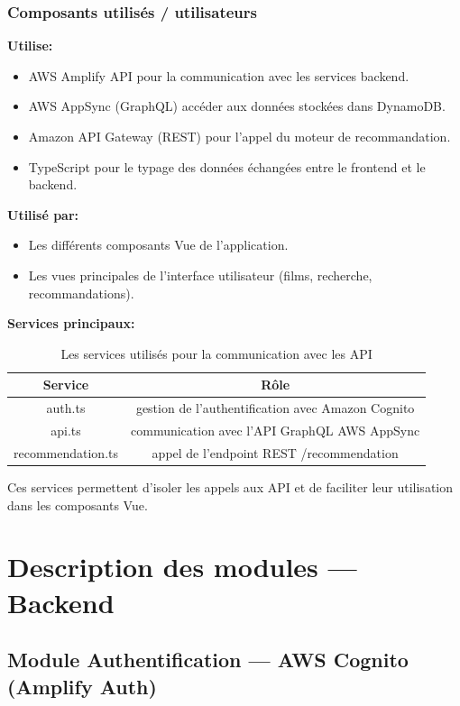 \documentclass[a4paper,12pt]{report}
\begin{document}
\subsubsection{Composants utilisés / utilisateurs}
\textbf{Utilise:}
\begin{itemize}
    \item AWS Amplify API pour la communication avec les services backend.
    \item AWS AppSync (GraphQL) accéder aux données stockées dans DynamoDB.
    \item Amazon API Gateway (REST) pour l'appel du moteur de recommandation.
    \item TypeScript pour le typage des données échangées entre le frontend et le backend.
\end{itemize}
\textbf{Utilisé par:}
\begin{itemize}
    \item Les différents composants Vue de l'application.
    \item Les vues principales de l'interface utilisateur (films, recherche, recommandations).
\end{itemize}

\newpage
\textbf{Services principaux:}
\begin{table}[h]
    \centering
    \begin{tabular}{c|c}
        \hline
        \textbf{Service}   & \textbf{Rôle} \\ \hline
        auth.ts  & gestion de l'authentification avec Amazon Cognito \\ \hline
        api.ts  & communication avec l'API GraphQL AWS AppSync \\ \hline
        recommendation.ts  & appel de l'endpoint REST /recommendation \\ \hline
    \end{tabular}
    \caption{Les services utilisés pour la communication avec les API}
\end{table}

Ces services permettent d'isoler les appels aux API et de faciliter leur utilisation dans les composants Vue.

\section{Description des modules — Backend}

\subsection{Module Authentification — AWS Cognito (Amplify Auth)}
\label{cogn}
\end{document}
